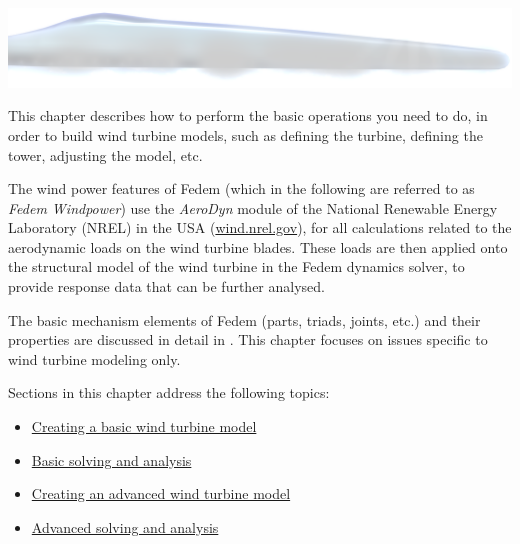 %
%

%
%


\includegraphics[width=\textwidth]{Figures/3b-Head1}

This chapter describes how to perform the basic operations you need to do,
in order to build wind turbine models, such as defining the turbine,
defining the tower, adjusting the model, etc.

The wind power features of Fedem (which in the following are referred to as
{\sl Fedem Windpower}) use the {\sl AeroDyn} module of the
National Renewable Energy Laboratory (NREL) in the USA
(\href{https://wind.nrel.gov/}{wind.nrel.gov}), for all calculations related to
the aerodynamic loads on the wind turbine blades. These loads are then applied
onto the structural model of the wind turbine in the Fedem dynamics solver,
to provide response data that can be further analysed.

The basic mechanism elements of Fedem (parts, triads, joints, etc.) and their
properties are discussed in detail in
.
This chapter focuses on issues specific to wind turbine modeling only.

Sections in this chapter address the following topics:

\begin{itemize}
\item
  \protect\hyperlink{creating-a-basic-wind-turbine-model}
                    {Creating a basic wind turbine model}
\item
  \protect\hyperlink{basic-solving-and-analysis}
                    {Basic solving and analysis}
\item
  \protect\hyperlink{creating-an-advanced-wind-turbine-model}
                    {Creating an advanced wind turbine model}
\item
  \protect\hyperlink{advanced-solving-and-analysis}
                    {Advanced solving and analysis}
\end{itemize}

